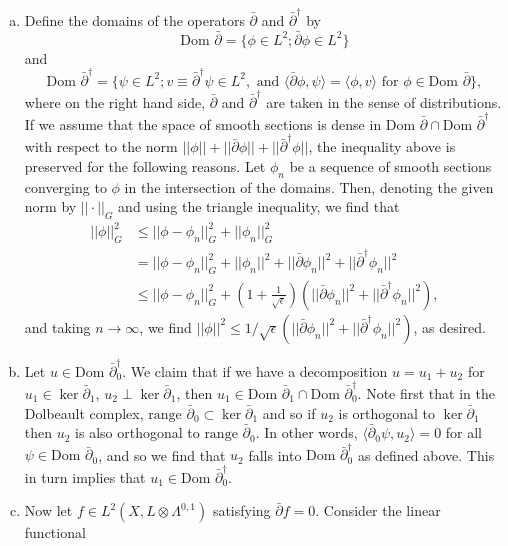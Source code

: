 \documentclass{../mathnotes}
\begin{document}
\begin{enumerate}[(a)]
    \item Define the domains of the operators $\bar\partial$ and $\bar\partial^\dagger$ by
        \[\text{Dom }\bar\partial=\{\phi\in L^2;\bar\partial\phi\in L^2\}\]
        and
        \[\text{Dom }\bar\partial^\dagger=\{\psi\in L^2;v\equiv \bar\partial^\dagger\psi\in L^2,\text{ and }\langle\bar\partial\phi,\psi\rangle=\langle\phi,v\rangle\text{ for }\phi\in\text{Dom }\bar\partial\},\]
        where on the right hand side, $\bar\partial$ and $\bar\partial^\dagger$ are taken in the sense of distributions.
        If we assume that the space of smooth sections is dense in $\text{Dom }\bar\partial\cap\text{Dom }\bar\partial^\dagger$ with
        respect to the norm $||\phi||+||\bar\partial\phi||+||\bar\partial^\dagger\phi||$, the inequality above is preserved for the following
        reasons. Let $\phi_n$ be a sequence of smooth sections converging to $\phi$ in the intersection of the domains.
        Then, denoting the given norm by $||\cdot||_G$ and using the triangle inequality, we find that
        \begin{align*}
            ||\phi||_G^2 &\leq ||\phi-\phi_n||_G^2 + ||\phi_n||_G^2\\
            &= ||\phi-\phi_n||_G^2 + ||\phi_n||^2+||\bar\partial\phi_n||^2+||\bar\partial^\dagger\phi_n||^2\\
            &\leq ||\phi-\phi_n||_G^2+\left(1+\frac{1}{\sqrt{\epsilon}}\right)\left( ||\bar\partial\phi_n||^2+||\bar\partial^\dagger\phi_n||^2 \right),
        \end{align*}
        and taking $n\to\infty$, we find $||\phi||^2\leq 1/\sqrt{\epsilon}(||\bar\partial\phi_n||^2+||\bar\partial^\dagger\phi_n||^2)$, as desired.
    \item Let $u\in\text{Dom }\bar\partial_0^\dagger$. We claim that if we have a decomposition $u=u_1+u_2$ for $u_1\in\ker\bar\partial_1$, $u_2\perp\ker\bar\partial_1$,
        then $u_1\in\text{Dom }\bar\partial_1\cap\text{Dom }\bar\partial_0^\dagger$. Note first that in the Dolbeault complex,
        $\text{range }\bar\partial_0\subset\ker \bar\partial_1$ and so if $u_2$ is orthogonal to $\ker\bar\partial_1$ then $u_2$ is
        also orthogonal to $\text{range }\bar\partial_0$. In other words,
        $\langle\bar\partial_0\psi,u_2\rangle=0$ for all $\psi\in\text{Dom }\bar\partial_0$, and so we find that $u_2$ falls into $\text{Dom }\bar\partial^\dagger_0$
        as defined above. This in turn implies that $u_1\in\text{Dom }\bar\partial^\dagger_0$.
    \item Now let $f\in L^2(X,L\otimes\Lambda^{0,1})$ satisfying $\bar\partial f=0$. Consider the linear functional

\end{enumerate}
\end{document}

